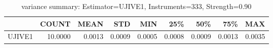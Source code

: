 \begin{table}[ht]
\centering
\caption{variance summary: Estimator=UJIVE1, Instruments=333, Strength=0.90}
\begin{tabular}{lrrrrrrrr}
\toprule
 & COUNT & MEAN & STD & MIN & 25\% & 50\% & 75\% & MAX \\
\midrule
UJIVE1 & 10.0000 & 0.0013 & 0.0009 & 0.0005 & 0.0008 & 0.0009 & 0.0013 & 0.0035 \\
\bottomrule
\end{tabular}
\end{table}
